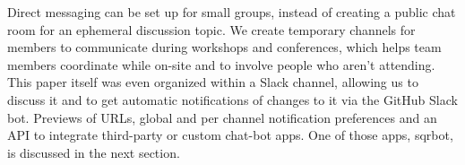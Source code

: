 Direct messaging can be set up for small groups,
instead of creating a public chat room for an ephemeral discussion topic.
We create temporary channels for members to communicate during workshops and
conferences, which helps team members coordinate while on-site and to involve
people who aren't attending.  This paper itself was even organized
within a Slack channel, allowing us to discuss it and to get automatic
notifications of changes to it via the GitHub Slack bot.
Previews of URLs, global and per channel notification preferences and an
API to integrate third-party or custom chat-bot apps. One of those apps,
sqrbot, is discussed in the next section.


